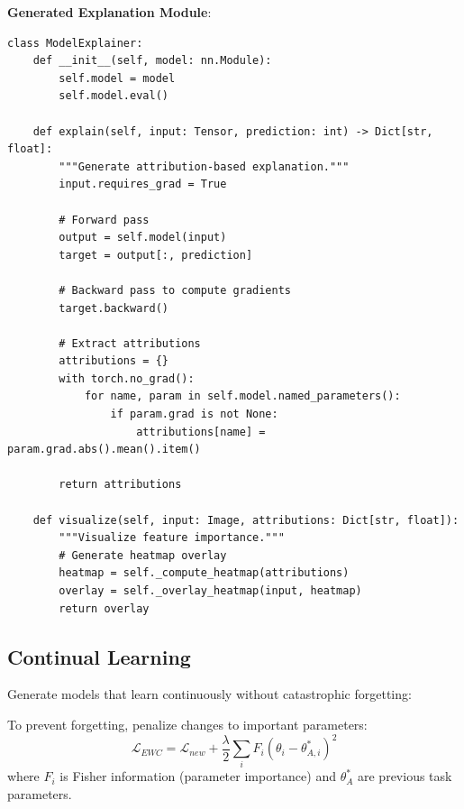 \textbf{Generated Explanation Module}:

\begin{verbatim}
class ModelExplainer:
    def __init__(self, model: nn.Module):
        self.model = model
        self.model.eval()

    def explain(self, input: Tensor, prediction: int) -> Dict[str, float]:
        """Generate attribution-based explanation."""
        input.requires_grad = True

        # Forward pass
        output = self.model(input)
        target = output[:, prediction]

        # Backward pass to compute gradients
        target.backward()

        # Extract attributions
        attributions = {}
        with torch.no_grad():
            for name, param in self.model.named_parameters():
                if param.grad is not None:
                    attributions[name] = param.grad.abs().mean().item()

        return attributions

    def visualize(self, input: Image, attributions: Dict[str, float]):
        """Visualize feature importance."""
        # Generate heatmap overlay
        heatmap = self._compute_heatmap(attributions)
        overlay = self._overlay_heatmap(input, heatmap)
        return overlay
\end{verbatim}

\subsection{Continual Learning}

Generate models that learn continuously without catastrophic forgetting:

\begin{theorem}
    To prevent forgetting, penalize changes to important parameters:
    \begin{equation}
        \mathcal{L}_{EWC} = \mathcal{L}_{new} + \frac{\lambda}{2} \sum_i F_i (\theta_i - \theta^*_{A,i})^2
    \end{equation}
    where $F_i$ is Fisher information (parameter importance) and $\theta^*_A$ are previous task parameters.
\end{theorem}

